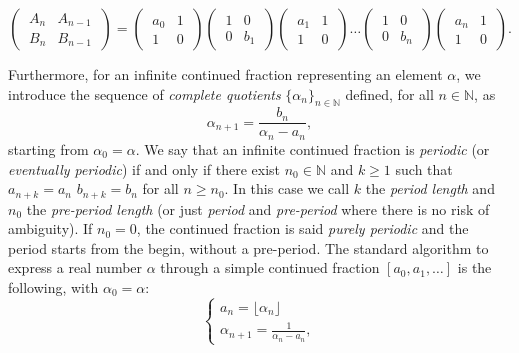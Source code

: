 \documentclass[12pt, reqno]{amsart}
\theoremstyle{plain}
\theoremstyle{definition}
\begin{document}
\begin{equation}\label{Eq: matrix}
\begin{pmatrix}
\ A_n & A_{n-1} \ \\
\ B_n & B_{n-1}  \ 
\end{pmatrix}
=
\begin{pmatrix}
\ a_0 & 1 \ \\
\ 1 & 0  \ 
\end{pmatrix}
\begin{pmatrix}
\ 1 & 0 \ \\
\ 0 & b_1  \ 
\end{pmatrix}
\begin{pmatrix}
\ a_1 & 1 \ \\
\ 1 & 0  \ 
\end{pmatrix}
\ldots
\begin{pmatrix}
\ 1 & 0 \ \\
\ 0 & b_n  \ 
\end{pmatrix}
\begin{pmatrix}
\ a_n & 1 \ \\
\ 1 & 0  \ 
\end{pmatrix}.
\end{equation}

Furthermore, for an infinite continued fraction representing an element $\alpha$, we introduce the sequence of \textit{complete quotients} $\{\alpha_n\}_{n\in\mathbb{N}}$ defined, for all $n\in\mathbb{N}$, as
\[\alpha_{n+1}=\frac{b_n}{\alpha_n-a_n},\]
starting from $\alpha_0=\alpha$. We say that an infinite continued fraction is \textit{periodic} (or \textit{eventually periodic}) if and only if there exist $n_0\in\mathbb{N}$ and $k\geq 1$ such that $a_{n+k}=a_n$ $b_{n+k}=b_n$ for all $n\geq n_0$. In this case we call $k$ the \textit{period length} and $n_0$ the \textit{pre-period length} (or just \textit{period} and \textit{pre-period} where there is no risk of ambiguity).
If $n_0=0$, the continued fraction is said \textit{purely periodic} and the period starts from the begin, without a pre-period. The standard algorithm to express a real number $\alpha$ through a simple continued fraction $[a_0,a_1,\ldots]$ is the following, with $\alpha_0=\alpha$:
\begin{equation}\label{Alg: R}
\begin{cases}
a_n=\lfloor \alpha_n \rfloor \\
\alpha_{n+1}=\frac{1}{\alpha_n-a_n},
\end{cases}
\end{equation}
\end{document}

